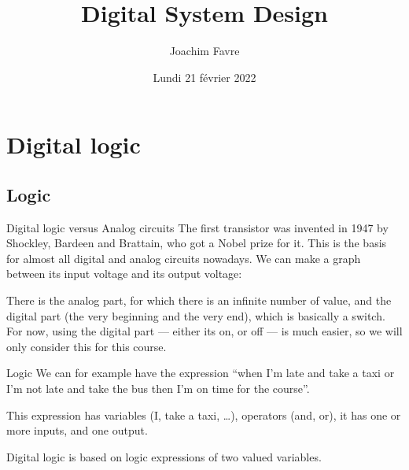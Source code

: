 \documentclass[a4paper]{article}
\title{Digital System Design}
\author{Joachim Favre}
\date{Lundi 21 février 2022}
\begin{document}
\maketitle


\section{Digital logic}
\subsection{Logic}
\begin{parag}{Digital logic versus Analog circuits}
    The first transistor was invented in 1947 by Shockley, Bardeen and Brattain, who got a Nobel prize for it. This is the basis for almost all digital and analog circuits nowadays. We can make a graph between its input voltage and its output voltage:

    There is the analog part, for which there is an infinite number of value, and the digital part (the very beginning and the very end), which is basically a switch. For now, using the digital part --- either its on, or off --- is much easier, so we will only consider this for this course.
\end{parag}

\begin{parag}{Logic}
    We can for example have the expression ``when I'm late and take a taxi or I'm not late and take the bus then I'm on time for the course''. 

    This expression has variables (I, take a taxi, \ldots), operators (and, or), it has one or more inputs, and one output.

    Digital logic is based on logic expressions of two valued variables.
\end{parag}
\end{document}
